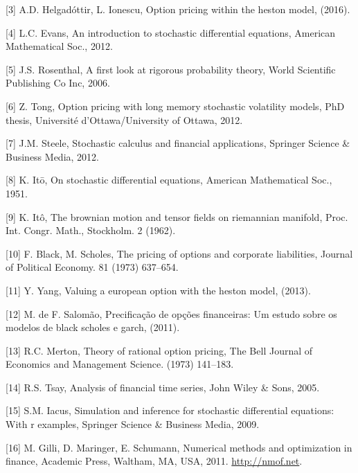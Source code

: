 \documentclass[12pt,twoside]{reedthesis}
\theoremstyle{definition}
\theoremstyle{definition}
\theoremstyle{remark}
\begin{document}
  \hypertarget{ref-helgadottir2016option}{}
  {[}3{]} A.D. Helgadóttir, L. Ionescu, Option pricing within the heston
  model, (2016).
  
  \hypertarget{ref-evans}{}
  {[}4{]} L.C. Evans, An introduction to stochastic differential
  equations, American Mathematical Soc., 2012.
  
  \hypertarget{ref-rosenthal}{}
  {[}5{]} J.S. Rosenthal, A first look at rigorous probability theory,
  World Scientific Publishing Co Inc, 2006.
  
  \hypertarget{ref-tong2012option}{}
  {[}6{]} Z. Tong, Option pricing with long memory stochastic volatility
  models, PhD thesis, Université d'Ottawa/University of Ottawa, 2012.
  
  \hypertarget{ref-steele2012stochastic}{}
  {[}7{]} J.M. Steele, Stochastic calculus and financial applications,
  Springer Science \& Business Media, 2012.
  
  \hypertarget{ref-ito1951}{}
  {[}8{]} K. Itō, On stochastic differential equations, American
  Mathematical Soc., 1951.
  
  \hypertarget{ref-ito1962}{}
  {[}9{]} K. Itô, The brownian motion and tensor fields on riemannian
  manifold, Proc. Int. Congr. Math., Stockholm. 2 (1962).
  
  \hypertarget{ref-black1973pricing}{}
  {[}10{]} F. Black, M. Scholes, The pricing of options and corporate
  liabilities, Journal of Political Economy. 81 (1973) 637--654.
  
  \hypertarget{ref-yang2013valuing}{}
  {[}11{]} Y. Yang, Valuing a european option with the heston model,
  (2013).
  
  \hypertarget{ref-salomao2011precificaccao}{}
  {[}12{]} M. de F. Salomão, Precificação de opções financeiras: Um estudo
  sobre os modelos de black scholes e garch, (2011).
  
  \hypertarget{ref-merton1973theory}{}
  {[}13{]} R.C. Merton, Theory of rational option pricing, The Bell
  Journal of Economics and Management Science. (1973) 141--183.
  
  \hypertarget{ref-tsay2005analysis}{}
  {[}14{]} R.S. Tsay, Analysis of financial time series, John Wiley \&
  Sons, 2005.
  
  \hypertarget{ref-iacus2009simulation}{}
  {[}15{]} S.M. Iacus, Simulation and inference for stochastic
  differential equations: With r examples, Springer Science \& Business
  Media, 2009.
  
  \hypertarget{ref-nmof}{}
  {[}16{]} M. Gilli, D. Maringer, E. Schumann, Numerical methods and
  optimization in finance, Academic Press, Waltham, MA, USA, 2011.
  \url{http://nmof.net}.
  
\end{document}
